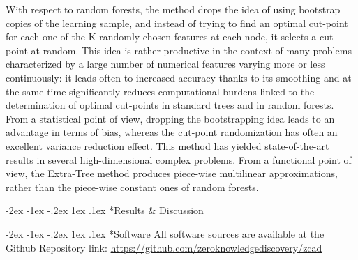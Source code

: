 \documentclass[twocolumn,,9pt]{IEEEtran}
\makeatletter
\renewcommand\section{\@startsection {section}{1}{\z@}%
  {-2ex \@plus -1ex \@minus -.2ex}%
  {1ex \@plus.1ex}%
  {\large\bfseries\scshape}}
\makeatother
\begin{document}
With respect to random forests, the method drops the idea of using bootstrap copies of the learning sample, and instead of trying to find an optimal cut-point for each one of the K randomly chosen features at each node, it selects a cut-point at random. This idea is rather productive in the context of many problems characterized by a large number of numerical features varying more or less continuously: it leads often to increased accuracy thanks to its smoothing and at the same time significantly reduces computational burdens linked to the determination of optimal cut-points in standard trees and in random forests. From a statistical point of view, dropping the bootstrapping idea leads to an advantage in terms of bias, whereas the cut-point randomization has often an excellent variance reduction effect. This method has yielded state-of-the-art results in several high-dimensional complex problems. From a functional point of view, the Extra-Tree method produces piece-wise multilinear approximations, rather than the piece-wise constant ones of random forests.

\section*{Results \& Discussion}


\section*{Software}
All software sources are available at the Github Repository link:
\href{https://github.com/zeroknowledgediscovery/zcad}{https://github.com/zeroknowledgediscovery/zcad}




\end{document}
